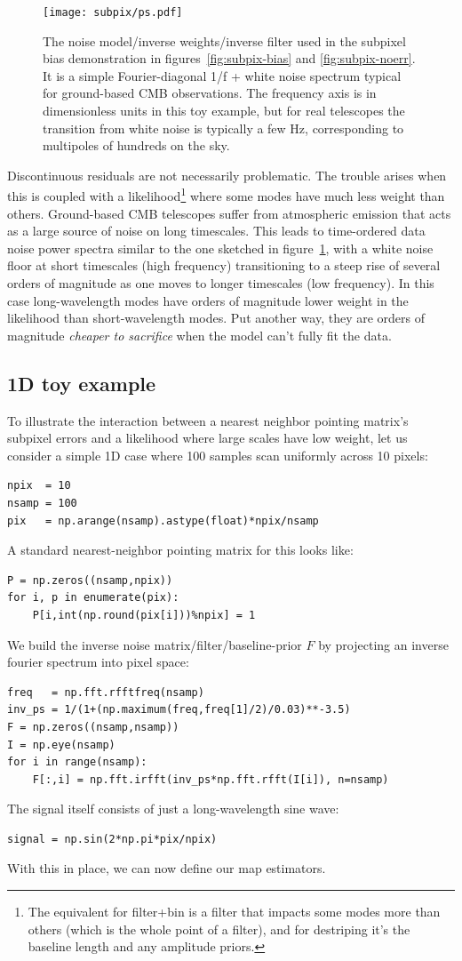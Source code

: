 \documentclass[twocolumn,apj]{aastex63}
\begin{document}
\begin{figure}
	\centering
	\texttt{[image: subpix/ps.pdf]}
	\caption{
		The noise model/inverse weights/inverse filter used in the subpixel
		bias demonstration in figures~\ref{fig:subpix-bias} and \ref{fig:subpix-noerr}.
		It is a simple Fourier-diagonal 1/f + white noise spectrum
		typical for ground-based CMB observations. The frequency axis is in
		dimensionless units in this toy example, but for real telescopes the
		transition from white noise is typically a few Hz, corresponding
		to multipoles of hundreds on the sky.
	}
	\label{fig:ps}
\end{figure}

Discontinuous residuals are not necessarily problematic. The trouble arises
when this is coupled with a likelihood\footnote{The equivalent for filter+bin is a filter that
impacts some modes more than others (which is the whole point of a filter),
and for destriping it's the baseline length and any amplitude priors.
} where some modes have much less weight than others. Ground-based CMB
telescopes suffer from atmospheric emission that acts as a large source
of noise on long timescales. This leads to time-ordered data noise power
spectra similar to the one sketched in figure~\ref{fig:ps}, with
a white noise floor at short timescales (high frequency) transitioning to a steep
rise of several orders of magnitude as one moves to longer timescales
(low frequency). In this case long-wavelength modes have orders of magnitude
lower weight in the likelihood than short-wavelength modes. Put another way,
they are orders of magnitude \emph{cheaper to sacrifice} when the model can't fully
fit the data.

\subsection{1D toy example}
To illustrate the interaction between a nearest neighbor pointing matrix's
subpixel errors and a likelihood where large scales have low weight, let
us consider a simple 1D case where 100 samples scan uniformly across 10 pixels:
\begin{lstlisting}
npix  = 10
nsamp = 100
pix   = np.arange(nsamp).astype(float)*npix/nsamp
\end{lstlisting}
A standard nearest-neighbor pointing matrix for this looks like:
\begin{lstlisting}
P = np.zeros((nsamp,npix))
for i, p in enumerate(pix):
	P[i,int(np.round(pix[i]))%npix] = 1
\end{lstlisting}
We build the inverse noise matrix/filter/baseline-prior $F$ by
projecting an inverse fourier spectrum into pixel space:
\begin{lstlisting}
freq   = np.fft.rfftfreq(nsamp)
inv_ps = 1/(1+(np.maximum(freq,freq[1]/2)/0.03)**-3.5)
F = np.zeros((nsamp,nsamp))
I = np.eye(nsamp)
for i in range(nsamp):
	F[:,i] = np.fft.irfft(inv_ps*np.fft.rfft(I[i]), n=nsamp)
\end{lstlisting}
The signal itself consists of just a long-wavelength sine wave:
\begin{lstlisting}
signal = np.sin(2*np.pi*pix/npix)
\end{lstlisting}
With this in place, we can now define our map estimators.
\end{document}
